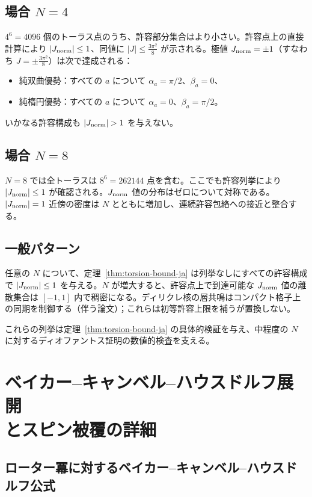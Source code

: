 \documentclass[dvipdfmx,a4paper]{article}
\theoremstyle{definition}
\theoremstyle{remark}
\newcommand{\Jnorm}{J_{\rm norm}}
\newcommand{\Jbound}{\frac{3\pi^2}{8}}
\begin{document}
\subsection{場合 \texorpdfstring{$N = 4$}{N = 4}}

$4^6 = 4096$ 個のトーラス点のうち、許容部分集合はより小さい。許容点上の直接計算により $|\Jnorm| \leq 1$、同値に $|J| \leq \Jbound$ が示される。極値 $\Jnorm = \pm 1$（すなわち $J = \pm \Jbound$）は次で達成される：
\begin{itemize}
  \item 純双曲優勢：すべての $a$ について $\alpha_a = \pi/2$、$\beta_a = 0$、
  \item 純楕円優勢：すべての $a$ について $\alpha_a = 0$、$\beta_a = \pi/2$。
\end{itemize}
いかなる許容構成も $|\Jnorm| > 1$ を与えない。

\subsection{場合 \texorpdfstring{$N = 8$}{N = 8}}

$N = 8$ では全トーラスは $8^6 = 262144$ 点を含む。ここでも許容列挙により $|\Jnorm| \leq 1$ が確認される。$\Jnorm$ 値の分布はゼロについて対称である。$|\Jnorm| = 1$ 近傍の密度は $N$ とともに増加し、連続許容包絡への接近と整合する。

\subsection{一般パターン}

任意の $N$ について、定理~\ref{thm:torsion-bound-ja} は列挙なしにすべての許容構成で $|\Jnorm| \leq 1$ を与える。$N$ が増大すると、許容点上で到達可能な $\Jnorm$ 値の離散集合は $[-1,1]$ 内で稠密になる。ディリクレ核の層共鳴はコンパクト格子上の同期を制御する（伴う論文）；これらは初等許容上限を補うが置換しない。

これらの列挙は定理~\ref{thm:torsion-bound-ja} の具体的検証を与え、中程度の $N$ に対するディオファントス証明の数値的検査を支える。

\section[ベイカー--キャンベル--ハウスドルフ展開とスピン被覆]{ベイカー--キャンベル--ハウスドルフ展開\\とスピン被覆の詳細}

\subsection{ローター冪に対するベイカー--キャンベル--ハウスドルフ公式}
\end{document}
